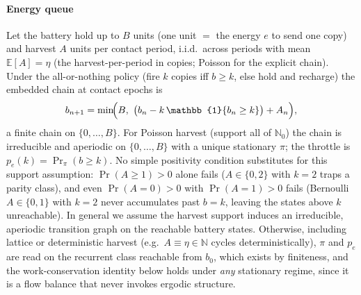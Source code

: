 \documentclass[twocolumn,3p,times,procedia]{elsarticle}
\theoremstyle{plain}
\theoremstyle{remark}
\newcommand{\E}{\mathbb{E}}
\newcommand{\Prob}{\Pr}
\newcommand{\ind}{\mathbb{1}}
\newcommand{\peff}{p_e}
\begin{document}
\paragraph*{Energy queue}
Let the battery hold up to $B$ units (one unit $=$ the energy $e$ to send
one copy) and harvest $A$ units per contact period, i.i.d.\ across periods
with mean $\E[A]=\eta$ (the harvest-per-period in copies; Poisson for the
explicit chain). Under the all-or-nothing policy (fire $k$ copies iff
$b\ge k$, else hold and recharge) the embedded chain at
contact epochs is
\begin{equation}
b_{n+1}=\min\!\Bigl(B,\ \bigl(b_n-k\,\ind\{b_n\ge k\}\bigr)+A_n\Bigr),
\end{equation}
a finite chain on $\{0,\dots,B\}$. For Poisson harvest (support all of
$\mathbb{N}_0$) the chain is irreducible and aperiodic on
$\{0,\dots,B\}$ with a unique stationary $\pi$; the throttle is
$\peff(k)=\Prob_\pi(b\ge k)$. No simple positivity condition
substitutes for this support assumption: $\Pr(A{\ge}1)>0$ alone fails
($A\in\{0,2\}$ with $k{=}2$ traps a parity class), and even
$\Pr(A{=}0)>0$ with $\Pr(A{=}1)>0$ fails (Bernoulli $A\in\{0,1\}$ with
$k{=}2$ never accumulates past $b{=}k$, leaving the states above $k$
unreachable). In general we assume the harvest support induces an
irreducible, aperiodic transition graph on the reachable battery
states. Otherwise, including lattice or deterministic harvest (e.g.\
$A\equiv\eta\in\mathbb{N}$ cycles deterministically), $\pi$ and
$\peff$ are read on the recurrent class reachable from $b_0$, which
exists by finiteness, and the work-conservation
identity below holds under \emph{any} stationary regime, since it is a
flow balance that never invokes ergodic structure.
\end{document}
